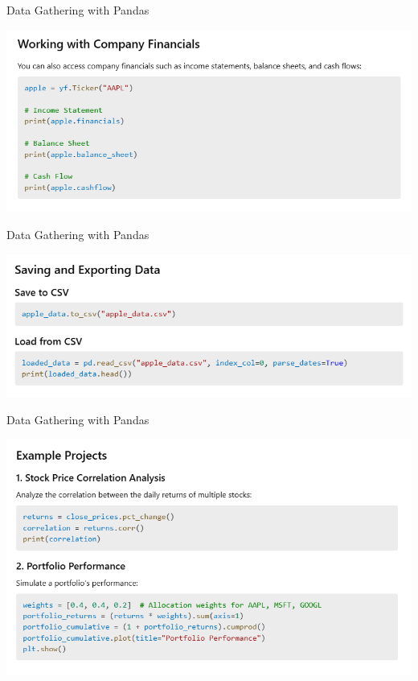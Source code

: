 \documentclass[11pt]{beamer}
\begin{document}
\begin{frame}{Data Gathering with Pandas}
	\begin{center}
	\includegraphics[scale=0.55]{../05-pictures/lesson-1-3_pic_20.png}
	\end{center}
\end{frame}
\begin{frame}{Data Gathering with Pandas}
	\begin{center}
	\includegraphics[scale=0.55]{../05-pictures/lesson-1-3_pic_21.png}
	\end{center}
\end{frame}
\begin{frame}{Data Gathering with Pandas}
	\begin{center}
	\includegraphics[scale=0.55]{../05-pictures/lesson-1-3_pic_22.png}
	\end{center}
\end{frame}
\end{document}

